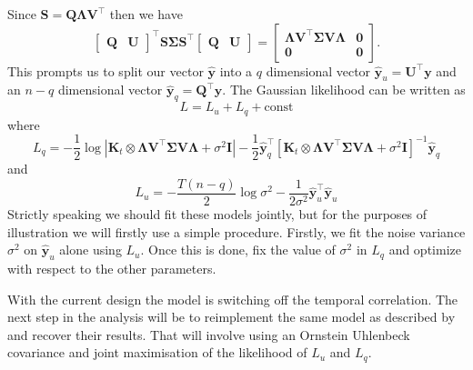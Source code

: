 Since $\mathbf{S} = \mathbf{Q}\boldsymbol{\Lambda}\mathbf{V}^\top$ then we have
\begin{equation} \label{eq:yqprime}
  \begin{bmatrix}\mathbf{Q} & \mathbf{U}\end{bmatrix}^\top \mathbf{S}\boldsymbol{\Sigma}\mathbf{S}^\top\begin{bmatrix}\mathbf{Q} & \mathbf{U}\end{bmatrix} 
    = 
  \begin{bmatrix}\boldsymbol{\Lambda} \mathbf{V}^\top \boldsymbol{\Sigma}\mathbf{V} \boldsymbol{\Lambda} &\mathbf{0} \\ \mathbf{0} & \mathbf{0}\end{bmatrix}.
\end{equation}
This prompts us to split our vector $\hat{\mathbf{y}}$ into a $q$ dimensional vector $\hat{\mathbf{y}}_u = \mathbf{U}^\top \mathbf{y}$ and 
an $n-q$ dimensional vector $\hat{\mathbf{y}}_q =\mathbf{Q}^\top \mathbf{y}$. The Gaussian likelihood can be written as
\begin{equation} \label{eq:LikelihoodParts}
L = L_u + L_q + \text{const}
\end{equation}
where
\begin{equation} \label{eq:Lq}
L_q = -\frac{1}{2} \log |\mathbf{K}_t\otimes
	  \boldsymbol{\Lambda}\mathbf{V}^\top\boldsymbol{\Sigma}\mathbf{V}\boldsymbol{\Lambda}+\sigma^2\mathbf{I}| 
	- \frac{1}{2} \hat{\mathbf{y}}_q^\top \left[\mathbf{K}_t\otimes 
	  \boldsymbol{\Lambda}\mathbf{V}^\top\boldsymbol{\Sigma}\mathbf{V}\boldsymbol{\Lambda}+\sigma^2\mathbf{I}\right]^{-1} \hat{\mathbf{y}}_q
\end{equation}
and
\begin{equation} \label{eq:Lu}
L_u = -\frac{T(n-q)}{2} \log \sigma^2  -\frac{1}{2\sigma^2} \hat{\mathbf{y}}_u^\top \hat{\mathbf{y}}_u
\end{equation}
Strictly speaking we should fit these models jointly, but for the purposes of illustration we will firstly use 
a simple procedure. Firstly, we fit the noise variance $\sigma^2$ on $\hat{\mathbf{y}}_u$ alone using $L_u$. 
Once this is done, fix the value of $\sigma^2$ in $L_q$ and optimize with respect to the other parameters.

With the current design the model is switching off the temporal correlation. The next step in the analysis will be to 
reimplement the same model as described by \cite{Sanguinetti:2006} 
and recover their results. That will involve using an Ornstein Uhlenbeck covariance and 
joint maximisation of the likelihood of $L_u$ and $L_q$.

